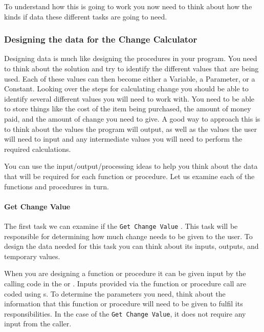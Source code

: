 To understand how this is going to work you now need to think about how the kinds if data these different tasks are going to need. 


\subsubsection{Designing the data for the Change Calculator} %
\label{ssub:designing_the_data_for_the_change_calculator}

Designing data is much like designing the procedures in your program. You need to think about the solution and try to identify the different values that are being used. Each of these values can then become either a Variable, a Parameter, or a Constant. Looking over the steps for calculating change you should be able to identify several different values you will need to work with. You need to be able to store things like the cost of the item being purchased, the amount of money paid, and the amount of change you need to give. A good way to approach this is to think about the values the program will output, as well as the values the user will need to input and any intermediate values you will need to perform the required calculations.

You can use the input/output/processing ideas to help you think about the data that will be required for each function or procedure. Let us examine each of the functions and procedures in turn.

\paragraph{Get Change Value} %
\label{par:get_change_value}
The first task we can examine if the \texttt{Get Change Value} . This task will be responsible for determining how much change needs to be given to the user. To design the data needed for this task you can think about its inputs, outputs, and temporary values.

When you are designing a function or procedure it can be given input by the calling code in the  or . Inputs provided via the function or procedure call are coded using s. To determine the parameters you need, think about the information that this function or procedure will need to be given to fulfil its responsibilities. In the case of the \texttt{Get Change Value}, it does not require any input from the caller.

